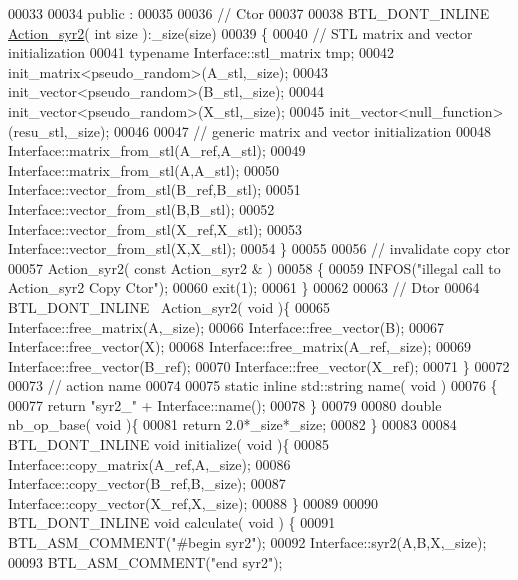 \begin{DoxyCode}
00033 
00034 public :
00035 
00036   \textcolor{comment}{// Ctor}
00037 
00038   BTL\_DONT\_INLINE \hyperlink{class_action__syr2}{Action\_syr2}( \textcolor{keywordtype}{int} size ):\_size(size)
00039   \{
00040     \textcolor{comment}{// STL matrix and vector initialization}
00041     \textcolor{keyword}{typename} Interface::stl\_matrix tmp;
00042     init\_matrix<pseudo\_random>(A\_stl,\_size);
00043     init\_vector<pseudo\_random>(B\_stl,\_size);
00044     init\_vector<pseudo\_random>(X\_stl,\_size);
00045     init\_vector<null\_function>(resu\_stl,\_size);
00046 
00047     \textcolor{comment}{// generic matrix and vector initialization}
00048     Interface::matrix\_from\_stl(A\_ref,A\_stl);
00049     Interface::matrix\_from\_stl(A,A\_stl);
00050     Interface::vector\_from\_stl(B\_ref,B\_stl);
00051     Interface::vector\_from\_stl(B,B\_stl);
00052     Interface::vector\_from\_stl(X\_ref,X\_stl);
00053     Interface::vector\_from\_stl(X,X\_stl);
00054   \}
00055 
00056   \textcolor{comment}{// invalidate copy ctor}
00057   Action\_syr2( \textcolor{keyword}{const}  Action\_syr2 & )
00058   \{
00059     INFOS(\textcolor{stringliteral}{"illegal call to Action\_syr2 Copy Ctor"});
00060     exit(1);
00061   \}
00062 
00063   \textcolor{comment}{// Dtor}
00064   BTL\_DONT\_INLINE ~Action\_syr2( \textcolor{keywordtype}{void} )\{
00065     Interface::free\_matrix(A,\_size);
00066     Interface::free\_vector(B);
00067     Interface::free\_vector(X);
00068     Interface::free\_matrix(A\_ref,\_size);
00069     Interface::free\_vector(B\_ref);
00070     Interface::free\_vector(X\_ref);
00071   \}
00072 
00073   \textcolor{comment}{// action name}
00074 
00075   \textcolor{keyword}{static} \textcolor{keyword}{inline} std::string name( \textcolor{keywordtype}{void} )
00076   \{
00077     \textcolor{keywordflow}{return} \textcolor{stringliteral}{"syr2\_"} + Interface::name();
00078   \}
00079 
00080   \textcolor{keywordtype}{double} nb\_op\_base( \textcolor{keywordtype}{void} )\{
00081     \textcolor{keywordflow}{return} 2.0*\_size*\_size;
00082   \}
00083 
00084   BTL\_DONT\_INLINE  \textcolor{keywordtype}{void} initialize( \textcolor{keywordtype}{void} )\{
00085     Interface::copy\_matrix(A\_ref,A,\_size);
00086     Interface::copy\_vector(B\_ref,B,\_size);
00087     Interface::copy\_vector(X\_ref,X,\_size);
00088   \}
00089 
00090   BTL\_DONT\_INLINE \textcolor{keywordtype}{void} calculate( \textcolor{keywordtype}{void} ) \{
00091       BTL\_ASM\_COMMENT(\textcolor{stringliteral}{"#begin syr2"});
00092       Interface::syr2(A,B,X,\_size);
00093       BTL\_ASM\_COMMENT(\textcolor{stringliteral}{"end syr2"});

\end{DoxyCode}
